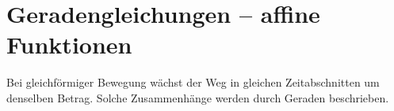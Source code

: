 \section{Geradengleichungen -- affine Funktionen}
\label{sec:real_functions_affine_functions}
Bei gleichförmiger Bewegung wächst der Weg in gleichen Zeitabschnitten um
denselben Betrag. Solche Zusammenhänge werden durch Geraden beschrieben.

